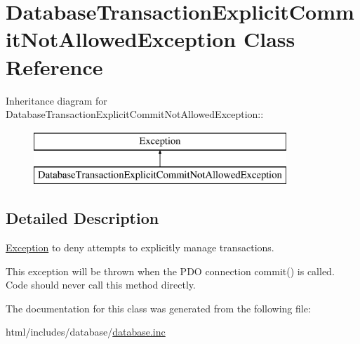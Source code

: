 \hypertarget{classDatabaseTransactionExplicitCommitNotAllowedException}{
\section{DatabaseTransactionExplicitCommitNotAllowedException Class Reference}
\label{classDatabaseTransactionExplicitCommitNotAllowedException}
}
Inheritance diagram for DatabaseTransactionExplicitCommitNotAllowedException::\begin{figure}[H]
\begin{center}
\leavevmode
\includegraphics[height=2cm]{classDatabaseTransactionExplicitCommitNotAllowedException}
\end{center}
\end{figure}


\subsection{Detailed Description}
\hyperlink{classException}{Exception} to deny attempts to explicitly manage transactions.

This exception will be thrown when the PDO connection commit() is called. Code should never call this method directly. 

The documentation for this class was generated from the following file:\begin{DoxyCompactItemize}
\item 
html/includes/database/\hyperlink{database_8inc}{database.inc}\end{DoxyCompactItemize}
